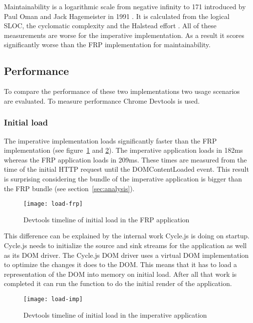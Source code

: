 Maintainability is a logarithmic scale from negative infinity to 171 introduced by Paul Oman and Jack Hagemeister in 1991 \cite{zuse-halstead}. It is calculated from the logical SLOC, the cyclomatic complexity and the Halstead effort \cite{zuse-halstead}. All of these measurements are worse for the imperative implementation. As a result it scores significantly worse than the FRP implementation for maintainability.

\subsection{Performance}

To compare the performance of these two implementations two usage scenarios are evaluated. To measure performance Chrome Devtools is used.

\subsubsection{Initial load}

The imperative implementation loads significantly faster than the FRP implementation (see figure~\ref{figure:load-frp} and \ref{figure:load-imp}). The imperative application loads in 182ms whereas the FRP application loads in 209ms. These times are measured from the time of the initial HTTP request until the DOMContentLoaded event. This result is surprising considering the bundle of the imperative application is bigger than the FRP bundle (see section~\ref{sec:analysis}). 

\begin{figure}[H]
	\centering
	\texttt{[image: load-frp]}
	\caption{Devtools timeline of initial load in the FRP application}
	\label{figure:load-frp}
\end{figure}

This difference can be explained by the internal work Cycle.js is doing on startup. Cycle.js needs to initialize the source and sink streams for the application as well as its DOM driver. The Cycle.js DOM driver uses a virtual DOM implementation to optimize the changes it does to the DOM. This means that it has to load a representation of the DOM into memory on initial load. After all that work is completed it can run the  function to do the initial render of the application.

\begin{figure}[H]
	\centering
	\texttt{[image: load-imp]}
	\caption{Devtools timeline of initial load in the imperative application}
	\label{figure:load-imp}
\end{figure}

